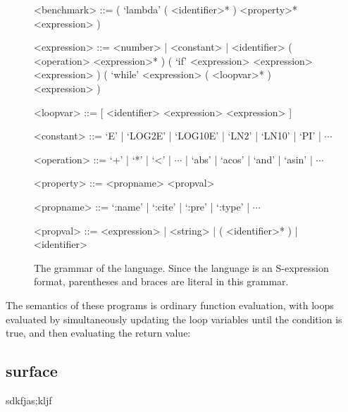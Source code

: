\documentclass[main.tex]{subfiles}
\begin{document}
\begin{figure}
\begin{grammar}
<benchmark> ::= ( `lambda' ( <identifier>* ) <property>* <expression> )

<expression> ::= <number> | <constant> | <identifier>
\alt ( <operation> <expression>* )
\alt ( `if' <expression> <expression> <expression> )
\alt ( `while' <expression> ( <loopvar>* ) <expression> )

<loopvar> ::= [ <identifier> <expression> <expression> ]

<constant> ::= `E' | `LOG2E' | `LOG10E' | `LN2' | `LN10' | `PI' | $\dotsb$

<operation> ::= `+' | `*' | `<' | $\dotsb$ | `abs' | `acos' | `and' | `asin' | $\dotsb$

<property> ::= <propname> <propval>

<propname> ::= `:name' | `:cite' | `:pre' | `:type' | $\dotsb$

<propval> ::= <expression> | <string> | ( <identifier>* ) | <identifier>

\end{grammar}
\caption{The grammar of the \core language. Since the language is an
  S-expression format, parentheses and braces are literal in this
  grammar.}
\label{fig:core}
\end{figure}

The semantics of these programs is ordinary function evaluation,
  with  loops evaluated
  by simultaneously updating the loop variables
  until the condition is true,
  and then evaluating the return value:

\begin{mathpar}

\end{mathpar}

\subsection{surface}

sdkfjas;kljf
\end{document}
